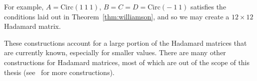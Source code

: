 \begin{example}
 For example, $A = \text{Circ}(1~1~1)$, $B=C=D=\text{Circ}(-~1~1)$ satisfies the conditions laid out in Theorem~\ref{thm:williamson}, and so we may create a $12 \times 12$ Hadamard matrix.
\end{example}

These constructions account for a large portion of the Hadamard matrices that are currently known, especially for smaller values. There are many other constructions for Hadamard matrices, most of which are out of the scope of this thesis (see~\cite{od-quad-forms} for more constructions).